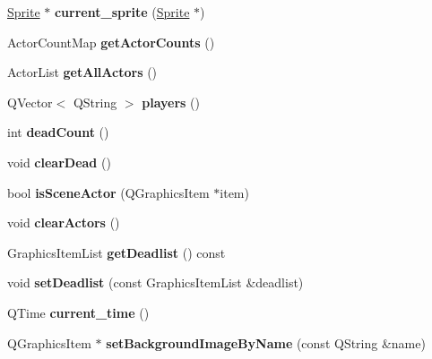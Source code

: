 \begin{DoxyCompactItemize}
\hyperlink{class_sprite}{Sprite} $\ast$ {\bfseries current\+\_\+sprite} (\hyperlink{class_sprite}{Sprite} $\ast$)
\item 
\mbox{\label{class_c_tile_scene_a3e0eef8a67dff7ddd479f918799dc2f3}} 
Actor\+Count\+Map {\bfseries get\+Actor\+Counts} ()
\item 
\mbox{\label{class_c_tile_scene_aa24304804db212df205d79bfe8c1b98e}} 
Actor\+List {\bfseries get\+All\+Actors} ()
\item 
\mbox{\label{class_c_tile_scene_a434168bf9ebfbcc6cec3147438f3c2a6}} 
Q\+Vector$<$ Q\+String $>$ {\bfseries players} ()
\item 
\mbox{\label{class_c_tile_scene_ab862b901cd16cdd0aca01d8c0603c7e6}} 
int {\bfseries dead\+Count} ()
\item 
\mbox{\label{class_c_tile_scene_a331440f7dceada3d9dd2032e66f53091}} 
void {\bfseries clear\+Dead} ()
\item 
\mbox{\label{class_c_tile_scene_ab5c61870b7b0361765504160b6420a8c}} 
bool {\bfseries is\+Scene\+Actor} (Q\+Graphics\+Item $\ast$item)
\item 
\mbox{\label{class_c_tile_scene_a3e8bb4fd9b53bd8ef85e9fb805b90274}} 
void {\bfseries clear\+Actors} ()
\item 
\mbox{\label{class_c_tile_scene_acdc455278db4d61b7cf7fcb200122193}} 
Graphics\+Item\+List {\bfseries get\+Deadlist} () const
\item 
\mbox{\label{class_c_tile_scene_ae1907597b192970a4cac1d743cf313e8}} 
void {\bfseries set\+Deadlist} (const Graphics\+Item\+List \&deadlist)
\item 
\mbox{\label{class_c_tile_scene_aee932ad39048d694ac18fa91c991ba54}} 
Q\+Time {\bfseries current\+\_\+time} ()
\item 
\mbox{\label{class_c_tile_scene_a28fedd460d2fbc672bcd7c7e004d0453}} 
Q\+Graphics\+Item $\ast$ {\bfseries set\+Background\+Image\+By\+Name} (const Q\+String \&name)

\end{DoxyCompactItemize}
